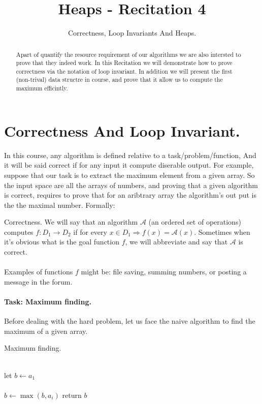 \title{Heaps - Recitation 4} 
\author{Correctness, Loop Invariants And Heaps.}


\begin{abstract}
  Apart of quantify the resource requirement of our algorithms we are also intersted to prove that they indeed work. In this Recitation we will demonstrate how to prove correctness via the notation of loop invariant. In addition we will present the first (non-trival) data structre in course, and prove that it allow us to compute the maximum efficintly.     
   
\end{abstract}


\section{Correctness And Loop Invariant.}
In this course, any algorithm is defined relative to a task/problem/function, And it will be said correct if for any input it compute diserable output. For example, suppose that our task is to extract the maximum element from a given array.
So the input space are all the arrays of numbers, and proving that a given algorithm is correct, requires to prove that for an aribtrary array the algorithm's out put is the the maximal number. Formally:  

\begin{defbox}{Correctness.}
We will say that an algorithm \( \mathcal{A}\) (an ordered set of operations) computes \( f:D_1 \rightarrow D_2 \) if for every \(x \in D_1 \Rightarrow f(x) = \mathcal{A}(x)\). Sometimes when it's obvious what is the goal function \(f\), we will abbreviate and say that \( \mathcal{A}\) is correct.       
\end{defbox}
\paragraph{}
Examples of functions \(f\) might be: file saving, summing numbers, or posting a message in the forum.  
\paragraph{Task: Maximum finding.} Before dealing with the hard problem, let us face the naive algorithm to find the maximum of a given array.

\begin{algbox}{Maximum finding.}
\begin{algorithm*}[H]
{}
 \ \\ 
 let \(b \leftarrow a_1 \) \\ 
 \ \\ 
  { 
        \(b \leftarrow \max \left(b, a_i \right) \)
    } 
 return \( b \) 
\end{algorithm*}
\end{algbox}

